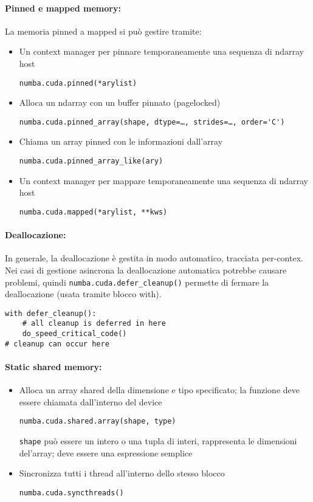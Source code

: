 \paragraph{Pinned e mapped memory:} La memoria pinned a mapped si può gestire tramite:
\begin{itemize}
	\item Un context manager per pinnare temporaneamente una sequenza di ndarray host
	\begin{verbatim}
numba.cuda.pinned(*arylist)
	\end{verbatim}
	\item Alloca un ndarray con un buffer pinnato (pagelocked)
	\begin{verbatim}
numba.cuda.pinned_array(shape, dtype=…, strides=…, order='C')
	\end{verbatim}
	\item Chiama un array pinned con le informazioni dall'array 
	\begin{verbatim}
numba.cuda.pinned_array_like(ary)
	\end{verbatim}
	\item Un context manager  per mappare temporaneamente una sequenza di ndarray host
	\begin{verbatim}
numba.cuda.mapped(*arylist, **kws)
	\end{verbatim}
\end{itemize}

\paragraph{Deallocazione:} In generale, la deallocazione è gestita in modo automatico, tracciata per-contex. Nei casi di gestione asincrona la deallocazione automatica potrebbe causare problemi, quindi \texttt{numba.cuda.defer\_cleanup()} permette di fermare la deallocazione (usata tramite blocco with). 
\begin{verbatim}
with defer_cleanup():
	# all cleanup is deferred in here
	do_speed_critical_code()
# cleanup can occur here
\end{verbatim}

\paragraph{Static shared memory:}
\begin{itemize}
	\item Alloca un array shared della dimensione e tipo specificato; la funzione deve essere chiamata dall'interno del device
	\begin{verbatim}
numba.cuda.shared.array(shape, type)
	\end{verbatim}
	\texttt{shape} può essere un intero o una tupla di interi, rappresenta le dimensioni del'array; deve essere una espressione semplice
	
	\item Sincronizza tutti i thread all'interno dello stesso blocco
	\begin{verbatim}
numba.cuda.syncthreads()
	\end{verbatim}
\end{itemize} 

